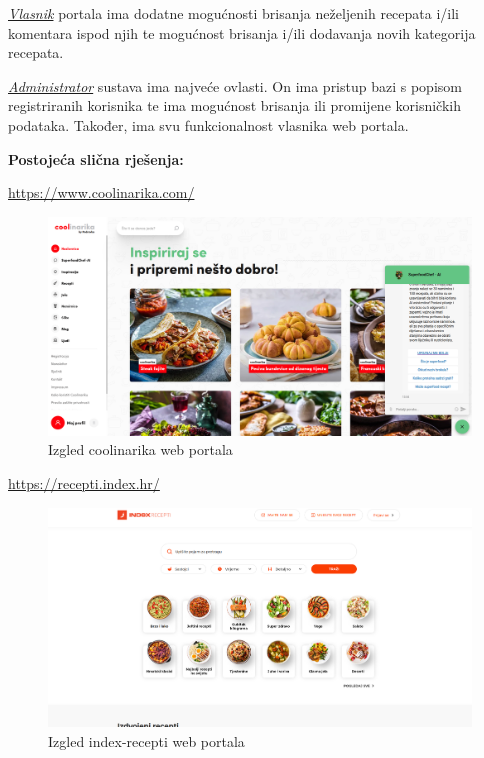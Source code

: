 		\underline{\textit{Vlasnik}} portala ima dodatne mogućnosti brisanja neželjenih recepata i/ili komentara ispod njih
		te mogućnost brisanja i/ili dodavanja novih kategorija recepata.

		\underline{\textit{Administrator}} sustava ima najveće ovlasti. On ima pristup bazi s popisom registriranih korisnika
		te ima mogućnost brisanja ili promijene korisničkih podataka. Također, ima svu funkcionalnost vlasnika web portala.
		
		\bigskip

		\textbf{Postojeća slična rješenja:}

		\url{https://www.coolinarika.com/}

		\begin{figure}[H]
			\includegraphics[scale=0.2]{slike/coolinarika.png}
			\centering
			\caption{Izgled coolinarika web portala}
			\label{fig:coolinarika}
		\end{figure}

		\url{https://recepti.index.hr/}

		\begin{figure}[H]
			\includegraphics[scale=0.2]{slike/index-recepti.png} 
			\centering
			\caption{Izgled index-recepti web portala}
			\label{fig:index-recepti}
		\end{figure}

